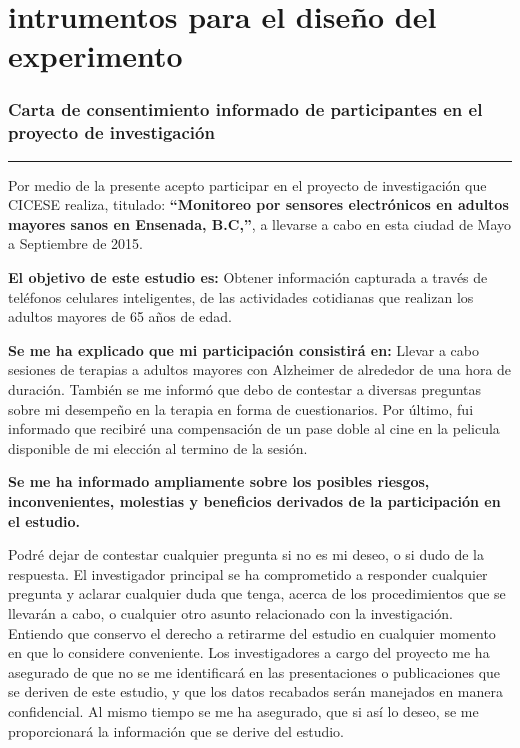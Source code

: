 \appendix{}
\chapter{intrumentos para el dise\~no del experimento}\label{aped:A}
\subsection{Carta de consentimiento informado de participantes en el proyecto de investigaci\'on} \label{aped:cartainfo}
\vspace{-3ex}%
\noindent
\rule{\textwidth}{1pt}
\vspace{-2ex}%

Por medio de la presente acepto participar en el proyecto de investigación que CICESE realiza, titulado: \textbf{``Monitoreo por sensores electrónicos en adultos mayores sanos en Ensenada, B.C,''}, a llevarse a cabo en esta ciudad de Mayo a Septiembre de 2015.

\textbf{El objetivo de este estudio es:} Obtener información capturada a través de teléfonos celulares  inteligentes, de las actividades cotidianas que realizan los adultos mayores de 65 años de edad.

\textbf{Se me ha explicado que mi participación consistirá en:}  Llevar a cabo sesiones de terapias a adultos mayores con Alzheimer de alrededor de una hora de duración. También se me informó que debo de contestar a diversas preguntas sobre mi desempeño en la terapia en forma de cuestionarios. Por último, fui informado que recibiré una compensación de un pase doble al cine en la pelicula disponible de mi elección al termino de la sesión.

\textbf{Se me ha informado ampliamente sobre los posibles riesgos, inconvenientes, molestias y beneficios derivados de la participación en el estudio.}

Podré dejar de contestar cualquier pregunta  si no es mi deseo, o si dudo de la respuesta.
El investigador principal se ha comprometido a responder cualquier pregunta y aclarar cualquier duda que tenga, acerca de los procedimientos que se llevarán a cabo, o cualquier otro asunto relacionado con la investigación.
Entiendo que conservo el derecho a retirarme del estudio en cualquier momento en que lo considere conveniente.
Los investigadores a cargo del proyecto me ha asegurado de que no se me identificará en las presentaciones o publicaciones que se deriven de este estudio, y que los datos recabados  serán manejados en manera confidencial. Al mismo tiempo se me ha asegurado, que si así lo deseo, se me proporcionará la información que se derive del estudio.

